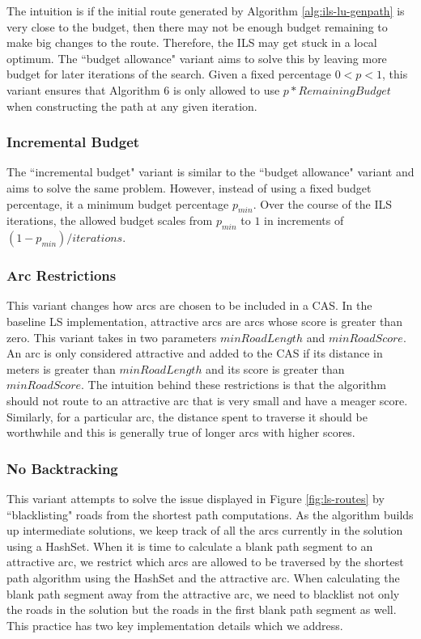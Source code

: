 \documentclass[11pt]{article}
\begin{document}
The intuition is if the initial route generated by Algorithm \ref{alg:ils-lu-genpath} is very close to the budget, then there may not be enough budget remaining to make big changes to the route. Therefore, the ILS may get stuck in a local optimum. The ``budget allowance" variant aims to solve this by leaving more budget for later iterations of the search. Given a fixed percentage $0 < p < 1$, this variant ensures that Algorithm 6 is only allowed to use $p * RemainingBudget$ when constructing the path at any given iteration. 

\subsubsection{Incremental Budget}
The ``incremental budget" variant is similar to the ``budget allowance" variant and aims to solve the same problem. However, instead of using a fixed budget percentage, it a minimum budget percentage $p_{min}$. Over the course of the ILS iterations, the allowed budget scales from $p_{min}$ to $1$ in increments of $(1 - p_{min}) / iterations$. 

\subsubsection{Arc Restrictions}
This variant changes how arcs are chosen to be included in a CAS. In the baseline LS implementation, attractive arcs are arcs whose score is greater than zero. This variant takes in two parameters $minRoadLength$ and $minRoadScore$. An arc is only considered attractive and added to the CAS if its distance in meters is greater than $minRoadLength$ and its score is greater than $minRoadScore$. The intuition behind these restrictions is that the algorithm should not route to an attractive arc that is very small and have a meager score. Similarly, for a particular arc, the distance spent to traverse it should be worthwhile and this is generally true of longer arcs with higher scores. 

\subsubsection{No Backtracking}
This variant attempts to solve the issue displayed in Figure \ref{fig:ls-routes} by ``blacklisting" roads from the shortest path computations. As the algorithm builds up intermediate solutions, we keep track of all the arcs currently in the solution using a HashSet. When it is time to calculate a blank path segment to an attractive arc, we restrict which arcs are allowed to be traversed by the shortest path algorithm using the HashSet and the attractive arc. When calculating the blank path segment away from the attractive arc, we need to blacklist not only the roads in the solution but the roads in the first blank path segment as well. This practice has two key implementation details which we address.
\end{document}

